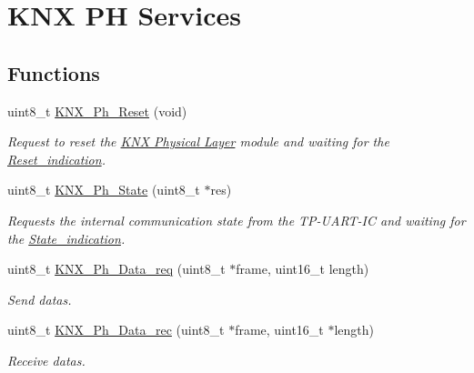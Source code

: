\hypertarget{group___k_n_x___p_h___sup___exported___functions___group3}{}\section{K\+NX PH Services}
\label{group___k_n_x___p_h___sup___exported___functions___group3}
\subsection*{Functions}
\begin{DoxyCompactItemize}
\item 
uint8\+\_\+t \hyperlink{group___k_n_x___p_h___sup___exported___functions___group3_ga5e5cc508d8f5528f85a275fa9dcb0b25}{K\+N\+X\+\_\+\+Ph\+\_\+\+Reset} (void)
\begin{DoxyCompactList}\small\item\em Request to reset the \hyperlink{group___k_n_x___p_h}{K\+NX Physical Layer} module and waiting for the \hyperlink{group___u_a_r_t___control___from_gade9c58399a01abdaa03bbecbf63879c3}{Reset\+\_\+indication}. \end{DoxyCompactList}\item 
uint8\+\_\+t \hyperlink{group___k_n_x___p_h___sup___exported___functions___group3_ga1032115e95decbb83116f74eeed1f3d0}{K\+N\+X\+\_\+\+Ph\+\_\+\+State} (uint8\+\_\+t $\ast$res)
\begin{DoxyCompactList}\small\item\em Requests the internal communication state from the T\+P-\/\+U\+A\+R\+T-\/\+IC and waiting for the \hyperlink{group___u_a_r_t___control___from_ga736e177182335771d7948dd74a7a1a5f}{State\+\_\+indication}. \end{DoxyCompactList}\item 
uint8\+\_\+t \hyperlink{group___k_n_x___p_h___sup___exported___functions___group3_gaa5513442e626a23391b18be925ae7e65}{K\+N\+X\+\_\+\+Ph\+\_\+\+Data\+\_\+req} (uint8\+\_\+t $\ast$frame, uint16\+\_\+t length)
\begin{DoxyCompactList}\small\item\em Send datas. \end{DoxyCompactList}\item 
uint8\+\_\+t \hyperlink{group___k_n_x___p_h___sup___exported___functions___group3_gac47024c84e321d2a4c81085dba1e918e}{K\+N\+X\+\_\+\+Ph\+\_\+\+Data\+\_\+rec} (uint8\+\_\+t $\ast$frame, uint16\+\_\+t $\ast$length)
\begin{DoxyCompactList}\small\item\em Receive datas. \end{DoxyCompactList}\end{DoxyCompactItemize}


